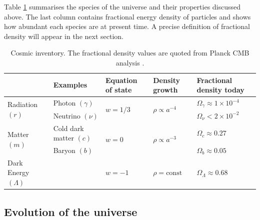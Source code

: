 \documentclass[a4paper,12pt,times,custombib,print,index]{Classes/PhDThesisPSnPDF} %
\providecommand{\DIFadd}[1]{{\protect\color{blue}\uwave{#1}}} %
\providecommand{\DIFaddbegin}{} %
\providecommand{\DIFaddend}{} %
\newcommand{\DIFaddincludegraphics}[2][]{{\color{blue}\fbox{\DIFOincludegraphics[#1]{#2}}}} %
\DeclareRobustCommand{\DIFaddbegin}{\DIFOaddbegin \let\includegraphics\DIFaddincludegraphics} %
\DeclareRobustCommand{\DIFaddend}{\DIFOaddend \let\includegraphics\DIFOincludegraphics} %
\begin{document}
Table \ref{table:cosmic_inventory} summarises the species of the universe and their properties discussed above. The last column contains \DIFaddbegin \DIFadd{the }\DIFaddend fractional energy density of particles and shows how abundant each species are at present time. A precise definition of fractional density will appear in the next section.

\begin{table}[h]
	\caption{Cosmic inventory. The fractional density values are quoted from Planck CMB analysis \cite{PlanckCollaboration2018Parameters}.}
	\centering
	\label{table:cosmic_inventory}
	\renewcommand{\arraystretch}{1.5} 
	\begin{tabular}{m{} m{} m{}<{\centering} m{}<{\centering} m{}<{\centering} }
		\toprule
		& Examples & Equation \newline of state & Density growth & Fractional density today \\ 

		\midrule
		\multirow{2}{*}{Radiation $(r)$} & Photon $(\gamma)$ & \multirow{2}{*}{$w = 1/3$} & \multirow{2}{*}{$\rho \propto a^{-4}$} & $\Omega_{\gamma} \approx 1 \times 10^{-4}$ \\
		& Neutrino $(\nu)$ & & & $\Omega_{\nu} < 2 \times 10^{-2}$ \\

		\midrule	
		\multirow{2}{*}{Matter $(m)$} & Cold dark \newline matter $(c)$ & \multirow{2}{*}{$w = 0$} & \multirow{2}{*}{$\rho \propto a^{-3}$} & $\Omega_{c} \approx 0.27$ \\
		& Baryon $(b)$ & & & $\Omega_{b} \approx 0.05$ \\

		\midrule
		Dark Energy $(\Lambda)$ & & $w=-1$ & $\rho=\text{const}$  & $\Omega_\Lambda \approx 0.68$\\
		\bottomrule
	\end{tabular}
\end{table}


\subsection{Evolution of the universe}
\end{document}
